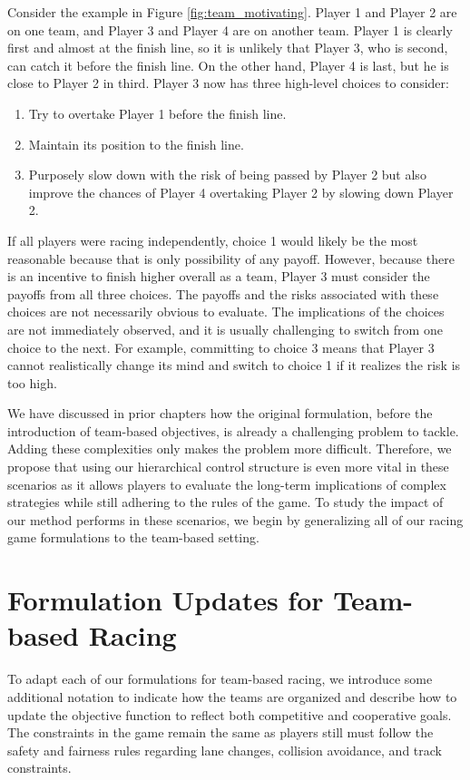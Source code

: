 Consider the example in Figure \ref{fig:team_motivating}. Player 1 and Player 2 are on one team, and Player 3 and Player 4 are on another team. Player 1 is clearly first and almost at the finish line, so it is unlikely that Player 3, who is second, can catch it before the finish line. On the other hand, Player 4 is last, but he is close to Player 2 in third. Player 3 now has three high-level choices to consider:
\begin{enumerate}
    \item Try to overtake Player 1 before the finish line.
    \item Maintain its position to the finish line.
    \item Purposely slow down with the risk of being passed by Player 2 but also improve the chances of Player 4 overtaking Player 2 by slowing down Player 2.
\end{enumerate}
If all players were racing independently, choice 1  would likely be the most reasonable because that is only possibility of any payoff. However, because there is an incentive to finish higher overall as a team, Player 3 must consider the payoffs from all three choices. The payoffs and the risks associated with these choices are not necessarily obvious to evaluate. The implications of the choices are not immediately observed, and it is usually challenging to switch from one choice to the next. For example, committing to choice 3 means that Player 3 cannot realistically change its mind and switch to choice 1 if it realizes the risk is too high. 

We have discussed in prior chapters how the original formulation, before the introduction of team-based objectives, is already a challenging problem to tackle. Adding these complexities only makes the problem more difficult. Therefore, we propose that using our hierarchical control structure is even more vital in these scenarios as it allows players to evaluate the long-term implications of complex strategies while still adhering to the rules of the game. To study the impact of our method performs in these scenarios, we begin by generalizing all of our racing game formulations to the team-based setting.

\section{Formulation Updates for Team-based Racing}
To adapt each of our formulations for team-based racing, we introduce some additional notation to indicate how the teams are organized and describe how to update the objective function to reflect both competitive and cooperative goals. The constraints in the game remain the same as players still must follow the safety and fairness rules regarding lane changes, collision avoidance, and track constraints.
